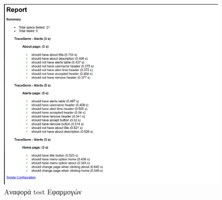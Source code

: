 \begin{figure}[h]
  \centering
  \includegraphics[width=150mm]{images/protractor-report.png}
  \caption{Αναφορά test Εφαρμογών}
  \label{fig:protractor-report}
\end{figure}